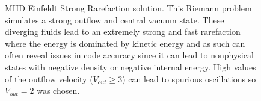 \begin{figure}[ht!]
    \caption{MHD Einfeldt Strong Rarefaction solution. This Riemann problem simulates a strong outflow and central vacuum state. These diverging fluids lead to an extremely strong and fast rarefaction where the energy is dominated by kinetic energy and as such can often reveal issues in code accuracy since it can lead to nonphysical states with negative density or negative internal energy. High values of the outflow velocity ($V_{out}\ge3$) can lead to spurious oscillations so $V_{out} = 2$ was chosen\citep{charm_2011}.
    }
    \label{fig:einfeldt}
\end{figure}